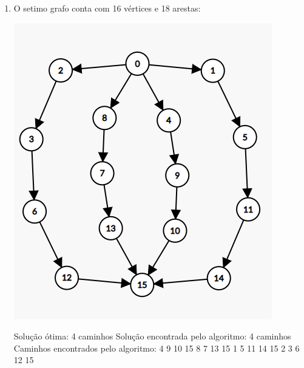 \begin{enumerate}
    
    \item O setimo grafo conta com 16 vértices e 18 arestas:
    \begin{center}
        \includegraphics[scale=0.5]{figuras/Grafo7.png}
    \end{center}
    Solução ótima: 4 caminhos\newline
    Solução encontrada pelo algoritmo: 4 caminhos\newline
    Caminhos encontrados pelo algoritmo: 4 9 10 15  8 7 13 15  1 5 11 14 15  2 3 6 12 15 \newline


\end{enumerate}
